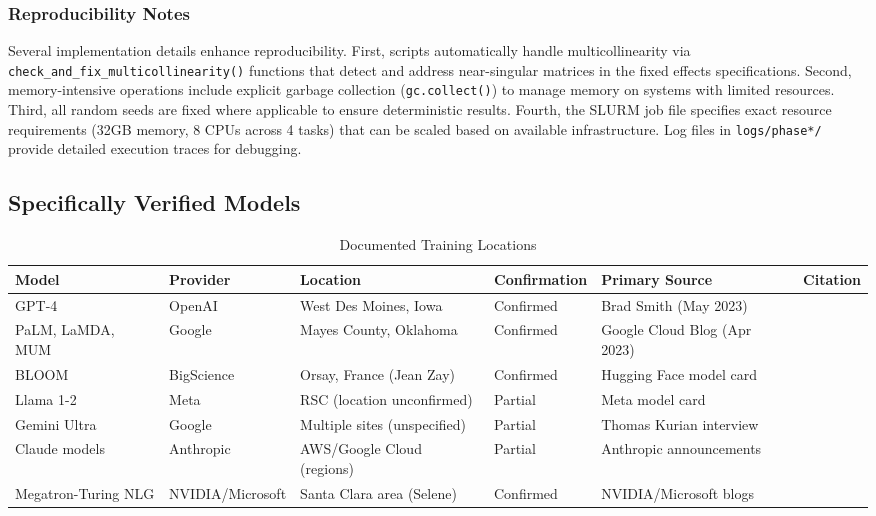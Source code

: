 \documentclass[a4paper,fleqn,longmktitle]{cas-sc}
\begin{document}
\subsubsection{Reproducibility Notes}
\label{appendix:reproducibility}

Several implementation details enhance reproducibility. First, scripts automatically handle multicollinearity via \texttt{check\_and\_fix\_multicollinearity()} functions that detect and address near-singular matrices in the fixed effects specifications. Second, memory-intensive operations include explicit garbage collection (\texttt{gc.collect()}) to manage memory on systems with limited resources. Third, all random seeds are fixed where applicable to ensure deterministic results. Fourth, the SLURM job file specifies exact resource requirements (32GB memory, 8 CPUs across 4 tasks) that can be scaled based on available infrastructure. Log files in \texttt{logs/phase*/} provide detailed execution traces for debugging.

\subsection{Specifically Verified Models}

\begin{table}[htbp]
\centering
\caption{Documented Training Locations}
\label{tab:training_locations}
\begin{tabular}{@{}llllll@{}}
\toprule
Model & Provider & Location & Confirmation & Primary Source & Citation \\
\midrule
GPT-4 & OpenAI & West Des Moines, Iowa & Confirmed & Brad Smith (May 2023) & \cite{smith2023iowa} \\
PaLM, LaMDA, MUM & Google & Mayes County, Oklahoma & Confirmed & Google Cloud Blog (Apr 2023) & \cite{googlecloud2023mlhub} \\
BLOOM & BigScience & Orsay, France (Jean Zay) & Confirmed & Hugging Face model card & \cite{luccioni2022bloom} \\
Llama 1-2 & Meta & RSC (location unconfirmed) & Partial & Meta model card & \cite{hpcwire2023rsc} \\
Gemini Ultra & Google & Multiple sites (unspecified) & Partial & Thomas Kurian interview & \cite{kurian2023dcd} \\
Claude models & Anthropic & AWS/Google Cloud (regions) & Partial & Anthropic announcements & \cite{anthropic2025infrastructure} \\
Megatron-Turing NLG & NVIDIA/Microsoft & Santa Clara area (Selene) & Confirmed & NVIDIA/Microsoft blogs & \cite{nvidia2021megatron} \\
\bottomrule
\end{tabular}
\end{table}
\end{document}
